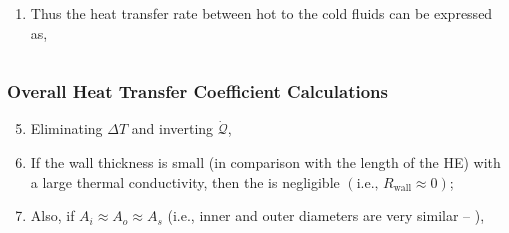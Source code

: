 \documentclass[10pt,compress,unknownkeysallowed]{beamer}
\begin{document}
\begin{frame}
\begin{columns}
\begin{column}[l]{0.5\linewidth}
\begin{enumerate}
            \item<4-> Thus the heat transfer rate between hot to the cold fluids can be expressed as,

         \end{enumerate}
       \end{column}      
    \end{columns}
\end{frame}


\begin{frame}
  \frametitle{Overall Heat Transfer Coefficient Calculations}
     \begin{enumerate}\setcounter{enumi}{4}%
        \item<1-> Eliminating $\Delta T$ and inverting $\dot{\mathcal{Q}}$,
        \item<2-> If the wall thickness is small (in comparison with the length of the HE) with a large thermal conductivity, then the  is negligible $\left(\text{i.e., }R_{\text{wall}} \approx 0\right)$;
        \item<3-> Also, if $A_{i}\approx A_{o} \approx A_{s}$ (i.e., inner and outer diameters are very similar -- ),
     \end{enumerate}

\end{frame}
\end{document}
